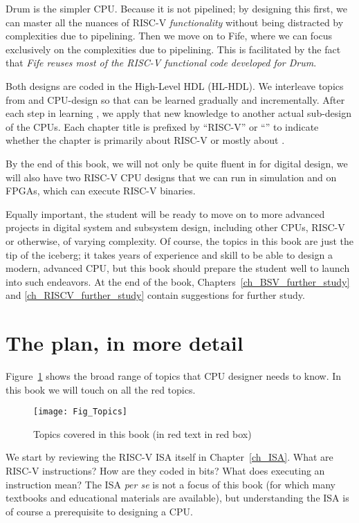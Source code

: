 Drum is the simpler CPU. Because it is not pipelined; by designing
this first, we can master all the nuances of RISC-V
\emph{functionality} without being distracted by complexities due to
pipelining.  Then we move on to Fife, where we can focus exclusively
on the complexities due to pipelining.  This is facilitated by the
fact that \emph{Fife reuses most of the RISC-V functional code
developed for Drum}.

Both designs are coded in the {\BSV} High-Level HDL (HL-HDL).  We
interleave topics from {\BSV} and CPU-design so that {\BSV} can be learned
gradually and incrementally.  After each step in learning {\BSV}, we
apply that new knowledge to another actual sub-design of the CPUs.
Each chapter title is prefixed by ``RISC-V'' or ``{\BSV}'' to indicate
whether the chapter is primarily about RISC-V or mostly about {\BSV}.

By the end of this book, we will not only be quite fluent in {\BSV} for
digital design, we will also have two RISC-V CPU designs that we can
run in simulation and on FPGAs, {\ie} which can execute RISC-V
binaries.

Equally important, the student will be ready to move on to more
advanced projects in digital system and subsystem design, including
other CPUs, RISC-V or otherwise, of varying complexity.  Of course,
the topics in this book are just the tip of the iceberg; it takes
years of experience and skill to be able to design a modern, advanced
CPU, but this book should prepare the student well to launch into such
endeavors.  At the end of the book,
Chapters~\ref{ch_BSV_further_study} and \ref{ch_RISCV_further_study}
contain suggestions for further study.


\section{The plan, in more detail}

Figure~\ref{Fig_Topics} shows the broad range of topics that CPU
designer needs to know.  In this book we will touch on all the red
topics.
\begin{figure}[htbp]
  \centerline{\texttt{[image: Fig\_Topics]}}
  \caption{\label{Fig_Topics}Topics covered in this book (in red text in red box)}
\end{figure}

We start by reviewing the RISC-V ISA itself in Chapter~\ref{ch_ISA}.
What are RISC-V instructions? How are they coded in bits? What does
executing an instruction mean?  The ISA \emph{per se} is not a focus
of this book (for which many textbooks and educational materials are
available), but understanding the ISA is of course a prerequisite to
designing a CPU.

